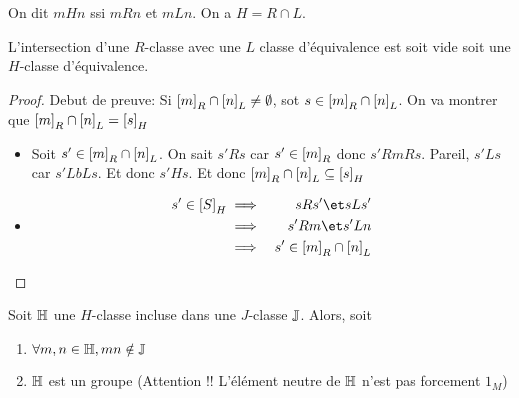 \begin{definition}
	On dit $m H n$ ssi $m R n $ et $m L n$. On a $H = R \cap L$.
\end{definition}

\begin{exercice}
	L'intersection d'une $R$-classe avec une $L$ classe d'équivalence est soit vide soit une $H$-classe d'équivalence.
\end{exercice}

\begin{proof}
	Debut de preuve:
	Si $\left[m\right]_R \cap \left[n\right]_L \neq \emptyset$, sot $s \in \left[m\right]_R \cap \left[n\right]_L$. On va montrer que
	$\left[m\right]_R \cap \left[n\right]_L = \left[s\right]_H$

	\begin{itemize}
		\item
		      Soit $s' \in \left[m\right]_R \cap \left[n\right]_L$. On sait $s' R s$ car $s' \in \left[m\right]_R$ donc $s' R m R s$.
		      Pareil, $s' L s$ car  $s' L b L s$.
		      Et donc $s' H s$. Et donc $\left[m\right]_R \cap \left[n\right]_L \subseteq \left[s\right]_H$

		\item
		      \begin{eqnarray}
			      s' \in \classh S &\implies& s R s' \et s L s'\\
			      &\implies& s' R m \et s' L n\\
			      &\implies& s' \in \classr m \cap \classl n
		      \end{eqnarray}

	\end{itemize}
\end{proof}

\begin{lemma}
	Soit $\mathbb{H}$ une $H$-classe incluse dans une $J$-classe $\mathbb{J}$. Alors, soit
	\begin{enumerate}
		\item $\forall m,n \in \mathbb{H}, mn \notin \mathbb{J}$
		\item $\mathbb{H}$ est un groupe (Attention !! L'élément neutre de $\mathbb{H}$ n'est pas forcement $1_M$)
	\end{enumerate}
\end{lemma}

